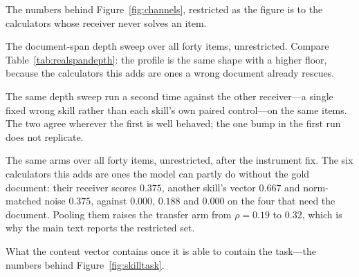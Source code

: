\documentclass{article}
\begin{document}
\begin{table}[h]
\caption{The numbers behind Figure~\ref{fig:channels}, restricted as the figure
is to the calculators whose receiver never solves an item.}
\label{tab:battery}
\centering
\small

\end{table}

\begin{table}[h]
\caption{The document-span depth sweep over all forty items, unrestricted.
Compare Table~\ref{tab:realspandepth}: the profile is the same shape with a
higher floor, because the calculators this adds are ones a wrong document
already rescues.}
\label{tab:realspan-all}
\centering
\small

\end{table}

\begin{table}[t]
\caption{The same depth sweep run a second time against the other receiver---a
single fixed wrong skill rather than each skill's own paired control---on the
same items. The two agree wherever the first is well behaved; the one bump in
the first run does not replicate.}
\label{tab:realspanfixed}
\centering
\small

\end{table}

\begin{table}[h]
\caption{The same arms over all forty items, unrestricted, after the instrument
fix. The six calculators this adds are ones the model can partly do without the
gold document: their receiver scores $0.375$, another skill's vector $0.667$ and
norm-matched noise $0.375$, against $0.000$, $0.188$ and $0.000$ on the four
that need the document. Pooling them raises the transfer arm from $\rho=0.19$
to $0.32$, which is why the main text reports the restricted set.}
\label{tab:battery-all}
\centering
\small

\end{table}

\begin{table}[h]
\caption{What the content vector contains once it is able to contain the
task---the numbers behind Figure~\ref{fig:skilltask}.}
\label{tab:skilltask}
\centering
\small

\end{table}


\label{app:tables}
\end{document}
